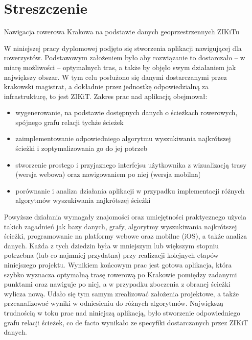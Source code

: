 \chapter{Streszczenie}
\label{cha:streszczenie}

Nawigacja rowerowa Krakowa na podstawie danych geoprzestrzennych ZIKiTu

W niniejszej pracy dyplomowej podjęto się stworzenia aplikacji nawigującej dla rowerzystów. Podstawowym założeniem było aby rozwiązanie to dostarczało – w miarę możliwości – optymalnych tras, a także by objęło swym działaniem jak największy obszar. W tym celu posłużono się danymi dostarczanymi przez krakowski magistrat, a dokładnie przez jednostkę odpowiedzialną za infrastrukturę, to jest ZIKiT. 
Zakres prac nad aplikacją obejmował:
\begin{itemize}
\item wygenerowanie, na podstawie dostępnych danych o ścieżkach rowerowych, spójnego grafu relacji tychże ścieżek
\item zaimplementowanie odpowiedniego algorytmu wyszukiwania najkrótszej ścieżki i zoptymalizowania go do jej potrzeb
\item stworzenie prostego i przyjaznego interfejsu użytkownika z wizualizacją trasy (wersja webowa) oraz nawigowaniem po niej (wersja mobilna)
\item porównanie i analiza działania aplikacji w przypadku implementacji różnych algorytmów wyszukiwania najkrótszej ścieżki
\end{itemize}
Powyższe działania wymagały znajomości oraz umiejętności praktycznego użycia takich zagadnień jak bazy danych, grafy, algorytmy wyszukiwania najkrótszej ścieżki, programowanie na platformy webowe oraz mobilne (iOS), a także analiza danych. Każda z tych dziedzin była w mniejszym lub większym stopniu potrzebna (lub co najmniej przydatna) przy realizacji kolejnych etapów niniejszego projektu.
Wynikiem końcowym prac jest gotowa aplikacja, która szybko wyznacza optymalną trasę rowerową po Krakowie pomiędzy zadanymi punktami oraz nawiguje po niej, a w przypadku zboczenia z obranej ścieżki wylicza nową. Udało się tym samym zrealizować założenia projektowe, a także przeanalizować wyniki w odniesieniu do różnych algorytmów.
Największą trudnością w toku prac nad niniejszą aplikacją, było stworzenie odpowiedniego grafu relacji ścieżek, co de facto wynikało ze specyfiki dostarczanych przez ZIKiT danych.